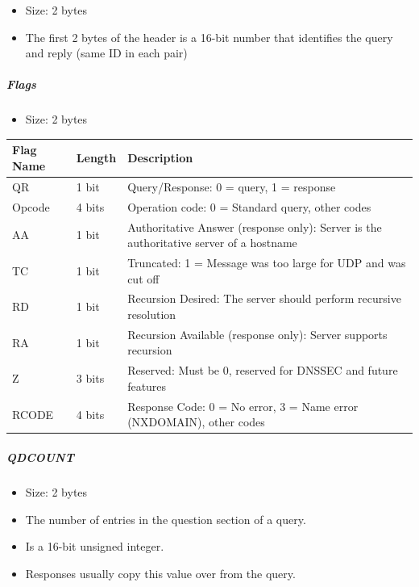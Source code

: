 \documentclass{article}
\begin{document}
\begin{itemize}
    \item Size: 2 bytes
    \item The first 2 bytes of the header is a 16-bit number that identifies the query and reply (same ID in each pair)
\end{itemize}

\subparagraph{Flags}

\begin{itemize}
    \item Size: 2 bytes
\end{itemize}

\begin{table}[H]
    \centering
    \begin{tabular}{|l|l|p{7cm}|}
        \hline
        \textbf{Flag Name} & \textbf{Length} & \textbf{Description} \\ \hline
        QR & 1 bit & Query/Response: 0 = query, 1 = response \\ \hline
        Opcode & 4 bits & Operation code: 0 = Standard query, other codes \\ \hline
        AA & 1 bit & Authoritative Answer (response only): Server is the authoritative server of a hostname \\ \hline
        TC & 1 bit & Truncated: 1 = Message was too large for UDP and was cut off \\ \hline
        RD & 1 bit & Recursion Desired: The server should perform recursive resolution \\ \hline
        RA & 1 bit & Recursion Available (response only): Server supports recursion \\ \hline
        Z & 3 bits & Reserved: Must be 0, reserved for DNSSEC and future features \\ \hline
        RCODE & 4 bits & Response Code: 0 = No error, 3 = Name error (NXDOMAIN), other codes \\ \hline
    \end{tabular}
\end{table}

\subparagraph{QDCOUNT}
\begin{itemize}
    \item Size: 2 bytes
    \item The number of entries in the question section of a query.
    \item Is a 16-bit unsigned integer.
    \item Responses usually copy this value over from the query.
\end{itemize}
\end{document}
